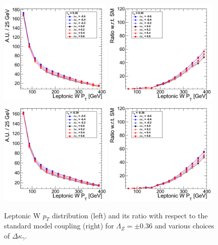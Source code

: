 \begin{figure}[h!t]
  {\centering
    \includegraphics[width=0.48\textwidth]{figs/LeptonicWpT_036.png}
    \includegraphics[width=0.48\textwidth]{figs/LeptonicWpT_036_ratio.png}
    \includegraphics[width=0.48\textwidth]{figs/LeptonicWpT_m036.png}
    \includegraphics[width=0.48\textwidth]{figs/LeptonicWpT_m036_ratio.png}
    \caption{Leptonic W $p_T$ distribution (left) and its ratio with respect to 
    the standard model coupling (right) for $\Lambda_Z = \pm 0.36$ and various choices of $\Delta{\kappa_\gamma}$.}
    \label{fig:ww_LeptonicWpT_atgcRatio036}}
\end{figure}
